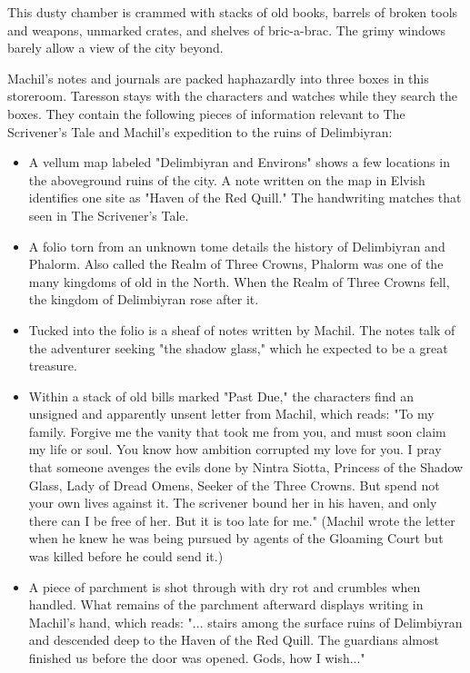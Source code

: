 \documentclass[10pt,a4paper,twoside,bg=print,twocolumn,openany,nodeprecatedcode]{dndbook}
\begin{document}
\begin{DndReadAloud}{}
This dusty chamber is crammed with stacks of old books, barrels of broken tools and weapons, unmarked crates, and shelves of bric-a-brac. The grimy windows barely allow a view of the city beyond.

\end{DndReadAloud}

Machil's notes and journals are packed haphazardly into three boxes in this storeroom. Taresson stays with the characters and watches while they search the boxes. They contain the following pieces of information relevant to The Scrivener's Tale and Machil's expedition to the ruins of Delimbiyran:


\begin{itemize}
\item A vellum map labeled "Delimbiyran and Environs" shows a few locations in the aboveground ruins of the city. A note written on the map in Elvish identifies one site as "Haven of the Red Quill." The handwriting matches that seen in The Scrivener's Tale.
\item A folio torn from an unknown tome details the history of Delimbiyran and Phalorm. Also called the Realm of Three Crowns, Phalorm was one of the many kingdoms of old in the North. When the Realm of Three Crowns fell, the kingdom of Delimbiyran rose after it.
\item Tucked into the folio is a sheaf of notes written by Machil. The notes talk of the adventurer seeking "the shadow glass," which he expected to be a great treasure.
\item Within a stack of old bills marked "Past Due," the characters find an unsigned and apparently unsent letter from Machil, which reads: "To my family. Forgive me the vanity that took me from you, and must soon claim my life or soul. You know how ambition corrupted my love for you. I pray that someone avenges the evils done by Nintra Siotta, Princess of the Shadow Glass, Lady of Dread Omens, Seeker of the Three Crowns. But spend not your own lives against it. The scrivener bound her in his haven, and only there can I be free of her. But it is too late for me." (Machil wrote the letter when he knew he was being pursued by agents of the Gloaming Court but was killed before he could send it.)
\item A piece of parchment is shot through with dry rot and crumbles when handled. What remains of the parchment afterward displays writing in Machil's hand, which reads: "... stairs among the surface ruins of Delimbiyran and descended deep to the Haven of the Red Quill. The guardians almost finished us before the door was opened. Gods, how I wish..."
\end{itemize}
\end{document}
